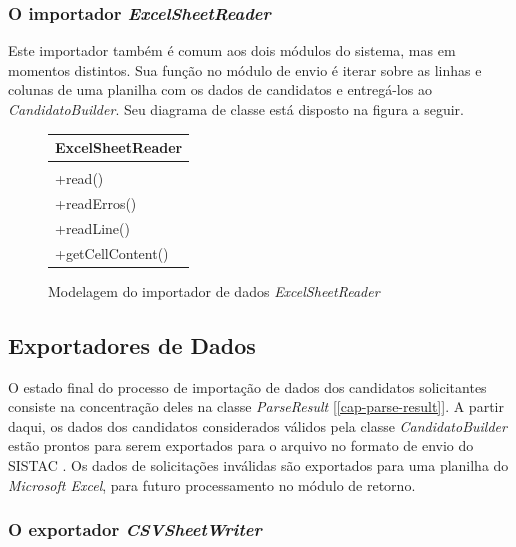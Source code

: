 \documentclass[
	12pt,			%
	openright,		%
	oneside,	
	a4paper,		%
	english,		%
	brazil			%
]{abntex2/abntex2}  %
\begin{document}
	\subsubsection{O importador \textit{ExcelSheetReader}}

	Este importador também é comum aos dois módulos do sistema, mas em momentos distintos. Sua função no módulo de envio é iterar sobre as linhas e colunas de uma planilha com os dados de candidatos e entregá-los ao \textit{CandidatoBuilder}. Seu diagrama de classe está disposto na figura a seguir.

	\begin{figure}[H]
		\begin{center}
			
			\caption{Modelagem do importador de dados \textit{ExcelSheetReader}}
			\label{excelreader-uml}
			
			\begin{tabular}{|l|}
				\hline
				\multicolumn{1}{|c|}{\textbf{ExcelSheetReader}} \\ \hline
				\\ \hline
				+read() \\
				+readErros() \\
				+readLine() \\
				+getCellContent() \\ \hline
			\end{tabular}
			
		\end{center}
	\end{figure}
	
	\subsection{Exportadores de Dados}
	
	O estado final do processo de importação de dados dos candidatos solicitantes consiste na concentração deles na classe \textit{ParseResult} [\ref{cap-parse-result}]. A partir daqui, os dados dos candidatos considerados válidos pela classe \textit{CandidatoBuilder} estão prontos para serem exportados para o arquivo no formato de envio do SISTAC \cite{sistac-formatos}. Os dados de solicitações inválidas são exportados para uma planilha do \textit{Microsoft Excel}, para futuro processamento no módulo de retorno.
	
	\subsubsection{O exportador \textit{CSVSheetWriter}}
	
\end{document}
